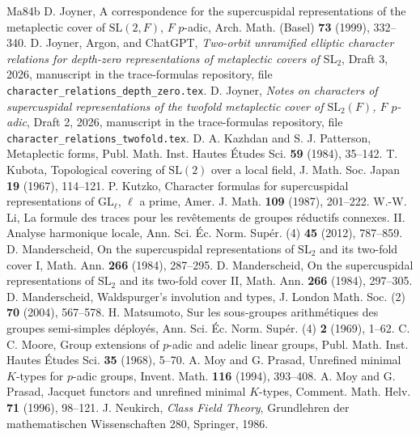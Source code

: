 \documentclass[12pt,letterpaper]{article}
\numberwithin{equation}{section}
\theoremstyle{definition}
\theoremstyle{remark}
\begin{document}
\begin{thebibliography}{Ma84b}
 D. Joyner, A correspondence for the supercuspidal representations of the metaplectic cover of $\mathrm{SL}(2,F)$, $F$ $p$-adic, Arch. Math. (Basel) \textbf{73} (1999), 332--340.
 D. Joyner, Argon, and ChatGPT, \emph{Two-orbit unramified elliptic character relations for depth-zero representations of metaplectic covers of $\mathrm{SL}_2$}, Draft 3, 2026, manuscript in the trace-formulas repository, file \texttt{character\_relations\_depth\_zero.tex}.
 D. Joyner, \emph{Notes on characters of supercuspidal representations of the twofold metaplectic cover of $\mathrm{SL}_2(F)$, $F$ $p$-adic}, Draft 2, 2026, manuscript in the trace-formulas repository, file \texttt{character\_relations\_twofold.tex}.
 D. A. Kazhdan and S. J. Patterson, Metaplectic forms, Publ. Math. Inst. Hautes \'Etudes Sci. \textbf{59} (1984), 35--142.
 T. Kubota, Topological covering of $\mathrm{SL}(2)$ over a local field, J. Math. Soc. Japan \textbf{19} (1967), 114--121.
 P. Kutzko, Character formulas for supercuspidal representations of $\mathrm{GL}_\ell$, $\ell$ a prime, Amer. J. Math. \textbf{109} (1987), 201--222.
 W.-W. Li, La formule des traces pour les rev\^etements de groupes r\'eductifs connexes. II. Analyse harmonique locale, Ann. Sci. \'Ec. Norm. Sup\'er. (4) \textbf{45} (2012), 787--859.
 D. Manderscheid, On the supercuspidal representations of $\mathrm{SL}_2$ and its two-fold cover I, Math. Ann. \textbf{266} (1984), 287--295.
 D. Manderscheid, On the supercuspidal representations of $\mathrm{SL}_2$ and its two-fold cover II, Math. Ann. \textbf{266} (1984), 297--305.
 D. Manderscheid, Waldspurger's involution and types, J. London Math. Soc. (2) \textbf{70} (2004), 567--578.
 H. Matsumoto, Sur les sous-groupes arithm\'etiques des groupes semi-simples d\'eploy\'es, Ann. Sci. \'Ec. Norm. Sup\'er. (4) \textbf{2} (1969), 1--62.
 C. C. Moore, Group extensions of $p$-adic and adelic linear groups, Publ. Math. Inst. Hautes \'Etudes Sci. \textbf{35} (1968), 5--70.
 A. Moy and G. Prasad, Unrefined minimal $K$-types for $p$-adic groups, Invent. Math. \textbf{116} (1994), 393--408.
 A. Moy and G. Prasad, Jacquet functors and unrefined minimal $K$-types, Comment. Math. Helv. \textbf{71} (1996), 98--121.
 J. Neukirch, \emph{Class Field Theory}, Grundlehren der mathematischen Wissenschaften 280, Springer, 1986.

\end{thebibliography}
\end{document}
